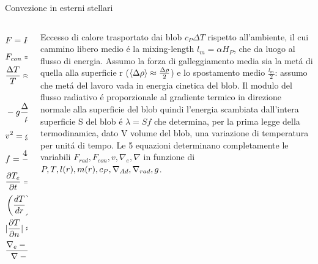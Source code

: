 \begin{wordonframe}{Convezione in esterni stellari}
    \begin{columns}[T]
        \begin{column}{0.5\textwidth}
            \begin{align*}
                &F=F_{con}+F_{rad}=\frac{\lsun{}}{4\pi r^2}\\
                &F_{con}=\exv{\rho vc_P\Delta T}\label{eq:convectiveflux}\tag{Avg on r-sphere}\\
                &\frac{\Delta T}{T}\approx\frac{1}{T}\PDy{r}{(\Delta T)}\underbrace{\frac{l_m}{2}}_{\Delta r\approx\frac{l_m}{2}}=(\nabla-\nabla_e)\frac{l_m}{2}\frac{1}{H_P}\\
                &-g\frac{\Delta\rho}{\rho}\tag{Force/unit mass}\\
                &v^2=g\delta(\nabla-\nabla_e)\frac{l_m^2}{8H_P}\\
                &f=\frac{4acT^3}{3\kappa\rho}|\PDy{n}{T}|\tag{Rad. exchange}\\
                &\PDy{t}{T_e}=-\frac{\lambda}{\rho Vc_P}\\
                &\Dcvar{\TDy{r}{T}}{e}=\Dcvar{\TDy{r}{T}}{ad}-\frac{\lambda}{\rho Vc_Pv}\label{eq:Tchangelength}\tag{$\Delta T$ per unit length by blob}\\
                &|\PDy{n}{T}|\approx\exv{\Delta T}\\
                &\frac{\nabla_e-\nad{}}{\nabla-\nabla_e}=\frac{6acT^3}{\kappa\rho^2c_Pl_mv}
            \end{align*}
        \end{column}
        \begin{column}{0.45\textwidth}
            Eccesso di calore trasportato dai blob $c_P\Delta T$ rispetto all'ambiente, il cui cammino libero medio \'e la mixing-length $l_m=\alpha H_P$, che da luogo al flusso di energia. Assumo la forza di galleggiamento media sia la met\'a di quella alla superficie r ($\exv{\Delta \rho}\approx\frac{\Delta\rho}{2}$) e lo spostamento medio $\frac{l_m}{2}$: assumo che met\'a del lavoro vada in energia cinetica del blob. Il modulo del flusso radiativo \'e proporzionale al gradiente termico in direzione normale alla superficie del blob quindi l'energia scambiata dall'intera superficie S del blob \'e $\lambda=Sf$ che determina, per la prima legge della termodinamica, dato V volume del blob, una variazione di temperatura per unit\'a di tempo. Le 5 equazioni determinano completamente le variabili $F_{rad}, F_{con}, v, \nabla_e, \nabla$ in funzione di $P,T,l(r),m(r),c_P,\nad{},\nrad{},g$.

\end{column}
\end{columns}
\end{wordonframe}
